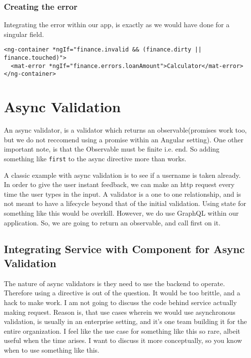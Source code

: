 \subsubsection{Creating the error}

Integrating the error within our app, is exactly as we would have done for a singular field.

\begin{lstlisting}[caption=finance-calculator.component.html]
<ng-container *ngIf="finance.invalid && (finance.dirty || finance.touched)">
  <mat-error *ngIf="finance.errors.loanAmount">Calculator</mat-error>
</ng-container>
\end{lstlisting}

\section{Async Validation}
An async validator, is a validator which returns an observable(promises work too, but we do not reccomend using a promise within an Angular setting). One other important note, is that the Observable must be finite i.e. end. So adding something like \lstinline{first} to the async directive more than works. 

A classic example with async validation is to see if a username is taken already. In order to give the user instant feedback, we can make an http request every time the user types in the input. A validator is a one to one relationship, and is not meant to have a lifecycle beyond that of the initial validation. Using state for something like this would be overkill. However, we do use GraphQL within our application. So, we are going to return an observable, and call first on it. 

\subsection{Integrating Service with Component for Async Validation}
The nature of async validators is they need to use the backend to operate. 
Therefore using a directive is out of the question. It would be too brittle, and a hack to make work. I am not going to discuss the code behind service actually making request. Reason is, that use cases wherein we would use asynchronous validation, is usually in an enterprise setting, and it's one team building it for the entire organization. I feel like the use case for something like this so rare, albeit useful when the time arises. I want to discuss it more conceptually, so you know when to use something like this.

